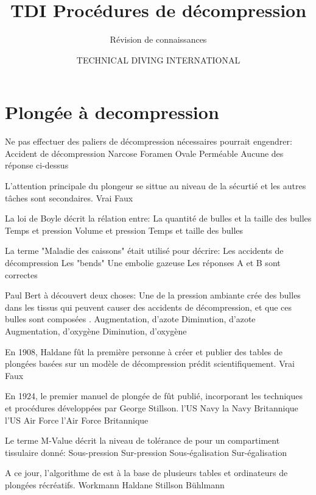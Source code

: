 \documentclass[english,12pt,a4paper]{article}
\title{TDI Procédures de décompression}
\subtitle{Révision de connaissances}
\author{TECHNICAL DIVING INTERNATIONAL}
\begin{document}


	\section{Plongée à decompression}

	\begin{outline}
		\1 Ne pas effectuer des paliers de décompression nécessaires pourrait engendrer:
			\2 Accident de décompression
			\2 Narcose
			\2 Foramen Ovale Perméable
			\2 Aucune des réponse ci-dessus

		\1 L'attention principale du plongeur se sittue au niveau de la sécurtié et les autres tâches sont secondaires.
			\2 Vrai
			\2 Faux

		\1 La loi de Boyle décrit la rélation entre:
			\2 La quantité de bulles et la taille des bulles
			\2 Temps et pression
			\2 Volume et pression
			\2 Temps et taille des bulles

		\1 La terme "Maladie des caissons" était utilisé pour décrire:
			\2 Les accidents de décompression
			\2 Les "bends"
			\2 Une embolie gazeuse
			\2 Les réponses A et B sont correctes

		\1 Paul Bert à découvert deux choses: Une \underline{\hspace{1.5cm}} de la pression ambiante crée des bulles dans les tissus qui peuvent causer des accidents de décompression, et que ces bulles sont composées \underline{\hspace{1.5cm}}.
			\2 Augmentation, d'azote
			\2 Diminution, d'azote
			\2 Augmentation, d'oxygène
			\2 Diminution, d'oxygène

		\1 En 1908, Haldane fût la première personne à créer et publier des tables de plongées basées sur un modèle de décompression prédit scientifiquement.
			\2 Vrai
			\2 Faux

		\1 En 1924, le premier manuel de plongée de \underline{\hspace{1.5cm}} fût publié, incorporant les techniques et procédures développées par George Stillson.
			\2 l'US Navy
			\2 la Navy Britannique
			\2 l'US Air Force
			\2 l'Air Force Britannique

		\1 Le terme M-Value décrit la niveau de tolérance de \underline{\hspace{1.5cm}} pour un compartiment tissulaire donné:
			\2 Sous-pression
			\2 Sur-pression
			\2 Sous-égalisation
			\2 Sur-égalisation

		\1 A ce jour, l'algorithme de \underline{\hspace{1.5cm}} est à la base de plusieurs tables et ordinateurs de plongées récréatifs.
			\2 Workmann
			\2 Haldane
			\2 Stillson
			\2 Bühlmann
	\end{outline}
	\pagebreak
\end{document}
